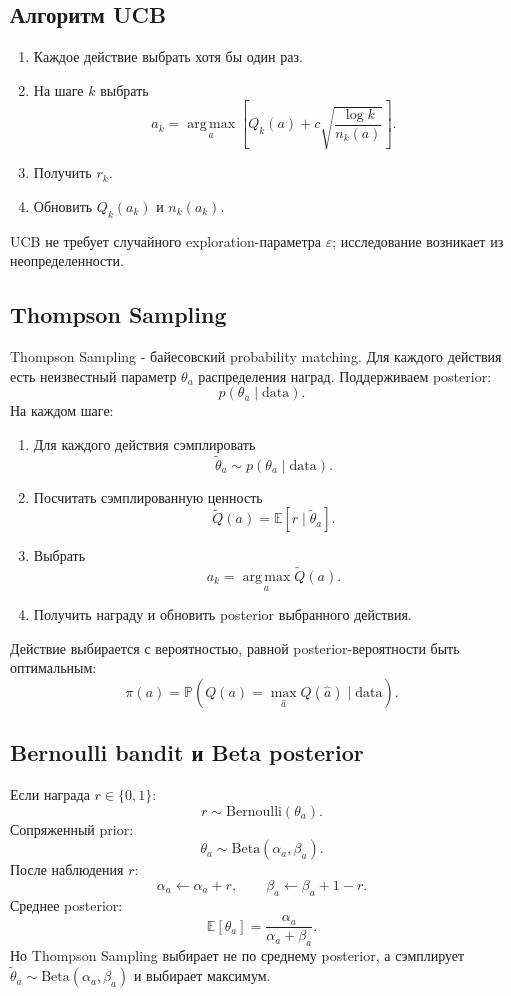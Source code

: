 \documentclass[11pt,a4paper]{article}
\newcommand{\E}{\mathbb{E}}
\renewcommand{\Prob}{\mathbb{P}}
\newcommand{\argmax}{\operatorname*{arg\,max}}
\newcommand{\1}{\mathbf{1}}
\begin{document}
\subsection*{Алгоритм UCB}
\begin{enumerate}
    \item Каждое действие выбрать хотя бы один раз.
    \item На шаге $k$ выбрать
    \[
        a_k=\argmax_a\left[Q_k(a)+c\sqrt{\frac{\log k}{n_k(a)}}\right].
    \]
    \item Получить $r_k$.
    \item Обновить $Q_k(a_k)$ и $n_k(a_k)$.
\end{enumerate}

UCB не требует случайного exploration-параметра $\varepsilon$; исследование возникает из неопределенности.

\subsection*{Thompson Sampling}
Thompson Sampling - байесовский probability matching. Для каждого действия есть неизвестный параметр $\theta_a$ распределения наград. Поддерживаем posterior:
\[
    p(\theta_a\mid \text{data}).
\]
На каждом шаге:
\begin{enumerate}
    \item Для каждого действия сэмплировать
    \[
        \tilde\theta_a\sim p(\theta_a\mid\text{data}).
    \]
    \item Посчитать сэмплированную ценность
    \[
        \tilde Q(a)=\E[r\mid \tilde\theta_a].
    \]
    \item Выбрать
    \[
        a_k=\argmax_a \tilde Q(a).
    \]
    \item Получить награду и обновить posterior выбранного действия.
\end{enumerate}

Действие выбирается с вероятностью, равной posterior-вероятности быть оптимальным:
\[
    \pi(a)=\Prob\left(Q(a)=\max_{\hat a}Q(\hat a)\mid\text{data}\right).
\]

\subsection*{Bernoulli bandit и Beta posterior}
Если награда $r\in\{0,1\}$:
\[
    r\sim \mathrm{Bernoulli}(\theta_a).
\]
Сопряженный prior:
\[
    \theta_a\sim\mathrm{Beta}(\alpha_a,\beta_a).
\]
После наблюдения $r$:
\[
    \alpha_a\leftarrow \alpha_a+r,
    \qquad
    \beta_a\leftarrow \beta_a+1-r.
\]
Среднее posterior:
\[
    \E[\theta_a]=\frac{\alpha_a}{\alpha_a+
    \beta_a}.
\]
Но Thompson Sampling выбирает не по среднему posterior, а сэмплирует $\tilde\theta_a\sim\mathrm{Beta}(\alpha_a,\beta_a)$ и выбирает максимум.
\end{document}
